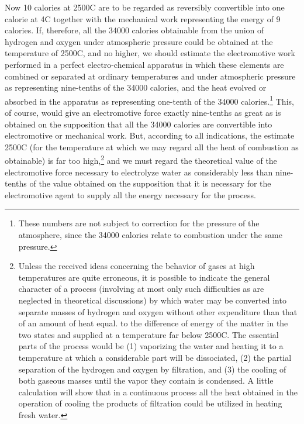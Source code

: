 \documentclass[12pt]{article}
\begin{document}
Now 10 calories at 2500\degree C are to be regarded as reversibly convertible into one calorie at 4\degree C together with the mechanical work representing the energy of 9 calories. If, therefore, all the 34000 calories obtainable from the union of hydrogen and oxygen under atmospheric pressure could be obtained at the temperature of
2500\degree C, and no higher, we should estimate the electromotive work performed in a perfect electro-chemical apparatus in which these elements are combined or separated at ordinary temperatures and under atmospheric pressure as representing nine-tenths of the 34000 calories, and the heat evolved or absorbed in the apparatus as representing one-tenth of the 34000 calories.\footnote{These numbers are not subject to correction for the pressure of the atmosphere, since the 34000 calories relate to combustion under the same pressure.} This, of course, would give an electromotive force exactly nine-tenths as great as is obtained on the supposition that all the 34000 calories are convertible into electromotive or mechanical work. But, according to all indications, the estimate 2500\degree C (for the temperature at which we may regard all the heat of combustion as obtainable) is far too high,\footnote{Unless the received ideas concerning the behavior of gases at high temperatures are quite erroneous, it is possible to indicate the general character of a process (involving at most only such difficulties as are neglected in theoretical discussions) by which water may be converted into separate masses of hydrogen and oxygen without other expenditure than that of an amount of heat equal. to the difference of energy of the matter in the two states and supplied at a temperature far below 2500\degree C. The essential parts of the process would be (1) vaporizing the water and heating it to a temperature at which a considerable part will be dissociated, (2) the partial separation of the hydrogen and oxygen by filtration, and (3) the cooling of both gaseous masses until the vapor they contain is condensed. A little calculation will show that in a continuous process all the heat obtained in the operation of cooling the products of filtration could be utilized in heating fresh water.} 
and we must regard the theoretical value of the electromotive force necessary to electrolyze water as considerably less than nine-tenths of the value obtained on the supposition that it is necessary for the electromotive agent to supply all the energy necessary for the process.
\end{document}
